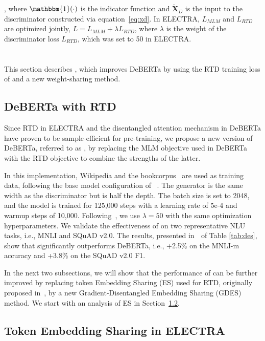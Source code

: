 , where $\mathbbm{1}(\cdot)$ is the indicator function and $\bm{\tilde{X}}_{D}$ is the input to the discriminator constructed via equation~\ref{eq:xd}. In ELECTRA, $L_{MLM}$ and $L_{RTD}$ are optimized jointly, $L = L_{MLM} + \lambda L_{RTD}$, where $\lambda$ is the weight of the discriminator loss $L_{RTD}$, which was set to 50 in ELECTRA.

\section{\ModelName}
\label{sec:method}
This section describes {\ModelName}, which improves DeBERTa by using the RTD training loss of \cite{clark2020electra} and a new weight-sharing method.

\subsection{DeBERTa with RTD} Since RTD in ELECTRA and the disentangled attention mechanism in DeBERTa have proven to be sample-efficient for pre-training, we propose a new version of DeBERTa, referred to as \emph{{\ModelName}}, by replacing the MLM objective used in DeBERTa with the RTD objective to combine the strengths of the latter.

In this implementation, Wikipedia and the bookcorpus~\citep{bookcorpus} are used as training data, following the base model configuration of~  \cite{devlin2018bert}. The generator is the same width as the discriminator but is half the depth. The batch size is set to 2048, and the model is trained for 125,000 steps with a learning rate of 5e-4 and warmup steps of 10,000. Following~\cite{clark2020electra}, we use $\lambda=50$ with the same optimization hyperparameters. We validate the effectiveness of {\ModelName} on two representative NLU tasks, i.e., MNLI and SQuAD v2.0. The results, presented in \textcircled{} of Table \ref{tab:des}, show that 
{\ModelName} significantly outperforms DeBERTa, i.e., +2.5\% on the MNLI-m accuracy and +3.8\% on the SQuAD v2.0 F1. 

In the next two subsections, we will show that the performance of {\ModelName} can be further improved by replacing token Embedding Sharing (ES) used for RTD, originally proposed in~\cite{clark2020electra}, by a new Gradient-Disentangled Embedding Sharing (GDES) method. We start with an analysis of ES in Section~\ref{sec:ana}.  

\subsection{Token Embedding Sharing in ELECTRA}
\label{sec:ana}

